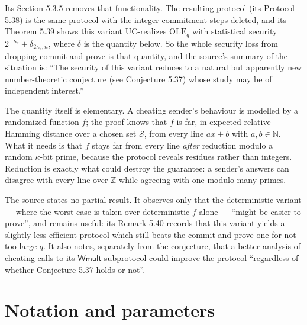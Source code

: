 \documentclass{conjura-conjecture}
\newcommand{\N}{\mathbb{N}}
\newcommand{\Sc}{\mathcal{S}}
\begin{document}
Its Section 5.3.5 removes that functionality. The resulting protocol
(its Protocol 5.38) is the same protocol with the integer-commitment
steps deleted, and its Theorem 5.39 shows this variant UC-realizes
$\mathrm{OLE}_{q}$ with statistical security $2^{-\kappa_{s}} +
\delta_{2\kappa_{s}, n}$, where $\delta$ is the quantity below. So the
whole security loss from dropping commit-and-prove is that quantity, and
the source's summary of the situation is: ``The security of this variant
reduces to a natural but apparently new number-theoretic conjecture (see
Conjecture 5.37) whose study may be of independent interest.''

The quantity itself is elementary. A cheating sender's behaviour is
modelled by a randomized function $f$; the proof knows that $f$ is far,
in expected relative Hamming distance over a chosen set $\Sc$, from
every line $ax + b$ with $a, b \in \N$. What it needs is that $f$ stays
far from every line \emph{after} reduction modulo a random
$\kappa$-bit prime, because the protocol reveals residues rather than
integers. Reduction is exactly what could destroy the guarantee: a
sender's answers can disagree with every line over $\mathbb{Z}$ while
agreeing with one modulo many primes.

The source states no partial result. It observes only that the
deterministic variant --- where the worst case is taken over
deterministic $f$ alone --- ``might be easier to prove'', and remains
useful: its Remark 5.40 records that this variant yields a slightly less
efficient protocol which still beats the commit-and-prove one for not too
large $q$. It also notes, separately from the conjecture, that a better
analysis of cheating calls to its $\mathsf{Wmult}$ subprotocol could
improve the protocol ``regardless of whether Conjecture 5.37 holds or
not''.

\section{Notation and parameters}\label{sec:notation}
\end{document}
